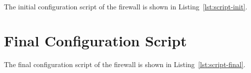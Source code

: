 \documentclass[a4paper,12pt]{report}
\begin{document}
The initial configuration script of the firewall is shown in Listing~\ref{lst:script-init}. 




\chapter{Final Configuration Script}
\label{app:fw-final}

The final configuration script of the firewall is shown in Listing~\ref{lst:script-final}.


\end{document}
